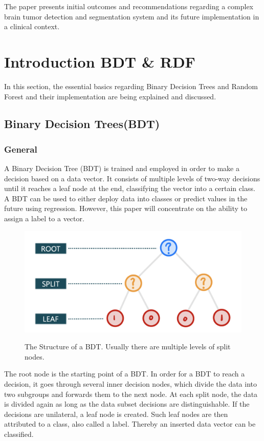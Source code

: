 \documentclass[
12pt,
headsepline,
bibliography=totoc,
twoside=semi,
fleqn
]{scrartcl}
\begin{document}
The paper presents initial outcomes and recommendations regarding a complex brain tumor detection and segmentation system and its future implementation in a clinical context.

\newpage

\section{Introduction BDT \& RDF\label{sec:sec2}}
In this section, the essential basics regarding Binary Decision Trees and Random Forest and their implementation are being explained and discussed.

 \subsection{Binary Decision Trees(BDT)\label{sec:sec2-1}}

 \subsubsection{General\label{sec:sec2-1-1}}
 A Binary Decision Tree (BDT) is trained and employed in order to make a decision based on a data vector. It consists of multiple levels of two-way decisions until it reaches a leaf node at the end, classifying the vector into a certain class. A BDT can be used to either deploy data into classes or predict values in the future using regression. However, this paper will concentrate on the ability to assign a label to a vector. 

 \begin{figure}[H]
 \centering \includegraphics[scale=0.55]{BDT1.png}\label{fig:fig1}
 \caption{The Structure of a BDT. Usually there are multiple levels of split nodes.}
 \end{figure}

 The root node is the starting point of a BDT. In order for a BDT to reach a decision, it goes through several inner decision nodes, which divide the data into two subgroups and forwards them to the next node. At each split node, the data is divided again as long as the data subset decisions are distinguishable. If the decisions are unilateral, a leaf node is created. Such leaf nodes are then attributed to a class, also called a label. Thereby an inserted data vector can be classified. 
\end{document}
